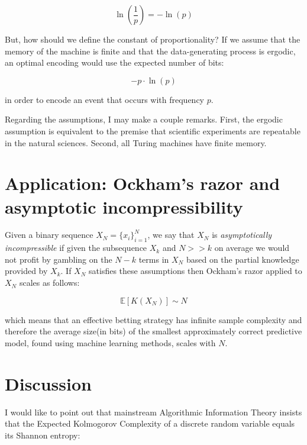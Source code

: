 \documentclass{article}
\begin{document}
\begin{equation}
\ln(\frac{1}{p}) = - \ln(p)
\end{equation}

But, how should we define the constant of proportionality? If we assume that the memory of the machine is finite and that
the data-generating process is ergodic, an optimal encoding would use the expected number of bits:

\begin{equation}
-p \cdot \ln(p)
\end{equation}

in order to encode an event that occurs with frequency $p$.

Regarding the assumptions, I may make a couple remarks. First, the ergodic assumption is equivalent to the premise that
scientific experiments are repeatable in the natural sciences. Second, all Turing machines have finite
memory.

\newpage 

\section{Application: Ockham's razor and asymptotic incompressibility}

Given a binary sequence $X_N = \{x_i\}_{i=1}^N$, we say that $X_N$ is \textit{asymptotically incompressible} if given the subsequence $X_k$ and $N >>k$ 
on average we would not profit by gambling on the $N-k$ terms in $X_N$ based 
on the partial knowledge provided by $X_k$. If $X_N$ satisfies these assumptions then Ockham's razor applied to $X_N$ scales as follows: 

\begin{equation}
\mathbb{E}[K(X_N)] \sim N	
\end{equation}

which means that an effective betting strategy has infinite sample complexity and therefore the average size(in bits) of the smallest approximately correct predictive model, found using machine learning methods, scales with 
$N$. 

\section{Discussion}

I would like to point out that mainstream Algorithmic Information Theory insists that the Expected Kolmogorov Complexity
of a discrete random variable equals its Shannon entropy:
\end{document}
